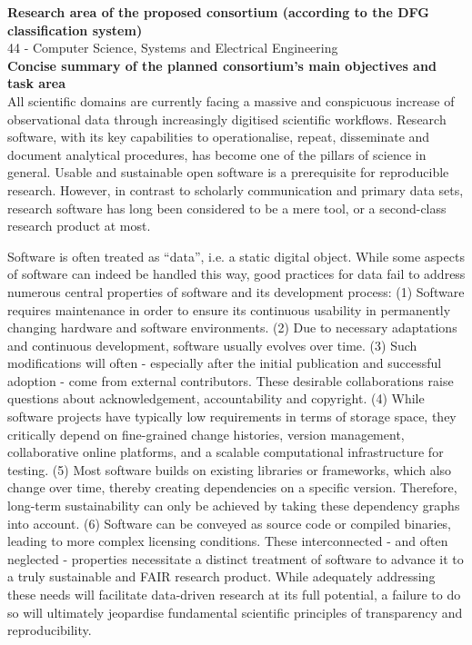 \documentclass[11pt,a4paper]{scrlttr2}
\begin{document}
\begin{letter}{}
\clearpage
{}

\textbf{Research area of the proposed consortium (according to the DFG classification system)}\\

44 - Computer Science, Systems and Electrical Engineering\\

\textbf{Concise summary of the planned consortium’s main objectives and task area}\\

All scientific domains are currently facing a massive and conspicuous increase of observational data through increasingly digitised scientific workflows. Research software, with its key capabilities to operationalise, repeat, disseminate and document analytical procedures, has become one of the pillars of science in general. Usable and  sustainable open software is a prerequisite for reproducible research. However, in contrast to scholarly communication and primary data sets, research software has long been considered to be a mere tool, or a second-class research product at most.

Software is often treated as “data”, i.e. a static digital object. While some aspects of software can indeed be handled this way, good practices for data fail to address numerous central properties of software and its development process: (1) Software requires maintenance in order to ensure its continuous usability in permanently changing hardware and software environments. (2) Due to necessary adaptations and continuous development, software usually evolves over time. (3) Such modifications will often - especially after the initial publication and successful adoption - come from external contributors. These desirable collaborations raise questions about acknowledgement, accountability and copyright. (4) While software projects have typically low requirements in terms of storage space, they critically depend on fine-grained change histories, version management, collaborative online platforms, and a scalable computational infrastructure for testing. (5) Most software builds on existing libraries or frameworks, which also change over time, thereby creating dependencies on a specific version. Therefore, long-term sustainability can only be achieved by taking these dependency graphs into account. (6) Software can be conveyed as source code or compiled binaries, leading to more complex licensing conditions. These interconnected - and often neglected - properties necessitate a distinct treatment of software to advance it to a truly sustainable and FAIR research product. While adequately addressing these needs will facilitate data-driven research at its full potential, a failure to do so will ultimately jeopardise fundamental scientific principles of transparency and reproducibility.


\end{letter}
\end{document}
